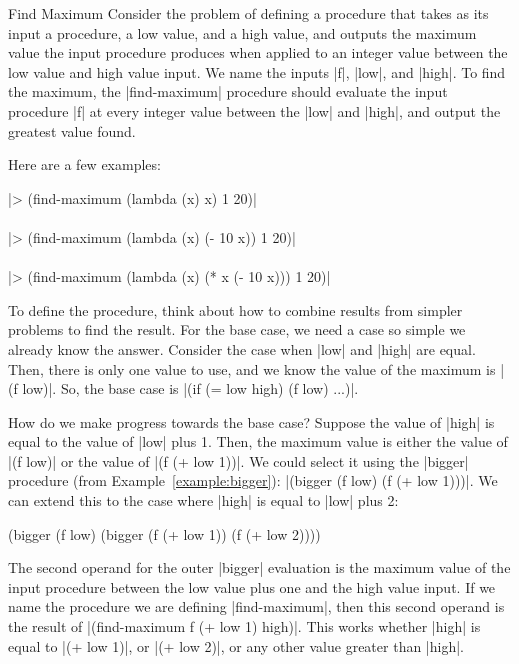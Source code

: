 \begin{schemeregion}
\begin{examplenobar}{Find Maximum\label{ex:maximum}}
Consider the problem of defining a procedure that takes as its input a procedure, a low value, and a high value, and outputs the maximum value the input procedure produces when applied to an integer value between the low value and high value input.  We name the inputs \scheme|f|, \scheme|low|, and \scheme|high|. To find the maximum, the \scheme|find-maximum| procedure should evaluate the input procedure \scheme|f| at every integer value between the \scheme|low| and \scheme|high|, and output the greatest value found.  

Here are a few examples:
\begin{code}
\scheme|> (find-maximum (lambda (x) x) 1 20)|\\
\\
\scheme|> (find-maximum (lambda (x) (- 10 x)) 1 20)|\\
\\
\scheme|> (find-maximum (lambda (x) (* x (- 10 x))) 1 20)|\\
\end{code}

To define the procedure, think about how to combine results from simpler problems to find the result.  For the base case, we need a case so simple we already know the answer.  Consider the case when \scheme|low| and \scheme|high| are equal.  Then, there is only one value to use, and we know the value of the maximum is \scheme|(f low)|.  So, the base case is \scheme|(if (= low high) (f low) ...)|.

How do we make progress towards the base case?  Suppose the value of \scheme|high| is equal to the value of \scheme|low| plus 1.  Then, the maximum value is either the value of \scheme|(f low)| or the value of \scheme|(f (+ low 1))|.  We could select it using the \scheme|bigger| procedure (from Example~\ref{example:bigger}): \scheme|(bigger (f low) (f (+ low 1)))|.  We can extend this to the case where \scheme|high| is equal to \scheme|low| plus 2:
\begin{schemedisplay}
(bigger (f low) (bigger (f (+ low 1)) (f (+ low 2))))
\end{schemedisplay}

The second operand for the outer \scheme|bigger| evaluation is the maximum value of the input procedure between the low value plus one and the high value input.  If we name the procedure we are defining \scheme|find-maximum|, then this second operand is the result of \scheme|(find-maximum f (+ low 1) high)|.  This works whether \scheme|high| is equal to \scheme|(+ low 1)|, or \scheme|(+ low 2)|, or any other value greater than \scheme|high|.  


\end{examplenobar}
\end{schemeregion}
